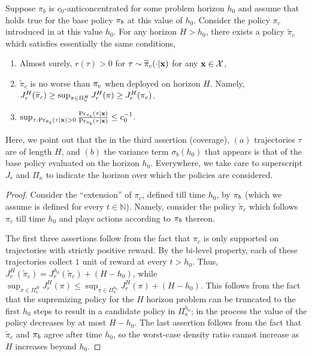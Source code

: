\begin{lemma} \label{lemma:pi_lambda_tilde}
Suppose $\pi_b$ is $c_0$-anticoncentrated for some problem horizon $h_0$ and assume that  holds true for the base policy $\pi_b$ at this value of $h_0$. Consider the policy $\pi_c$ introduced in  at this value $h_0$. For any horizon $H > h_0$, there exists a policy $\widetilde{\pi}_c$ which satisfies essentially the same conditions,
\begin{enumerate}
    \item Almost surely, $r(\tau) > 0$ for $\tau \sim \widetilde{\pi}_c (\cdot|\mathbf{x})$ for any $\mathbf{x} \in \mathcal{X}$,
    \item $\widetilde{\pi}_c$ is no worse than $\pi_e$ when deployed on horizon $H$. Namely, $J_r^H (\widetilde{\pi}_c) \ge \sup_{\pi \in \Pi_\kappa^H} J_r^H (\pi) \ge J_r^H (\pi_e) $.
    \item $\sup_{\tau : \Pr_{\pi_b} (\tau|\mathbf{x}) > 0} \frac{\Pr_{\pi_c} (\tau|\mathbf{x})}{\Pr_{\pi_b} (\tau|\mathbf{x})} \le c_0^{-1}$. %
\end{enumerate}
Here, we point out that the in the third assertion (coverage), $(a)$ trajectories $\tau$ are of length $H$, and $(b)$ the variance term $\sigma_b (h_0)$ that appears is that of the base policy evaluated on the horizon $h_0$. Everywhere, we take care to superscript $J_r$ and $\Pi_\kappa$ to indicate the horizon over which the policies are considered.
\end{lemma}
\begin{proof}
Consider the ``extension'' of $\pi_c$, defined till time $h_0$, by $\pi_b$ (which we assume is defined for every $t \in \mathbb{N}$). Namely, consider the policy $\widetilde{\pi}_c$ which follows $\pi_c$ till time $h_0$ and plays actions according to $\pi_b$ thereon.

The first three assertions follow from the fact that $\pi_c$ is only supported on trajectories with strictly positive reward. By the bi-level property, each of these trajectories collect $1$ unit of reward at every $t > h_0$. Thus, $J^H_r (\widetilde{\pi}_c) = J^{h_0}_r (\widetilde{\pi}_c) + (H-h_0)$, while $\sup_{\pi \in \Pi_\kappa^H} J_r^H (\pi) \le \sup_{\pi \in \Pi_\kappa^{h_0}} J_r^H (\pi) + (H-h_0)$. This follows from the fact that the supremizing policy for the $H$ horizon problem can be truncated to the first $h_0$ steps to result in a candidate policy in $\Pi_\kappa^{h_0}$; in the process the value of the policy decreases by at most $H-h_0$. The last assertion follows from the fact that $\widetilde{\pi}_c$ and $\pi_b$ agree after time $h_0$, so the worst-case density ratio cannot increase as $H$ increases beyond $h_0$.
\end{proof}










